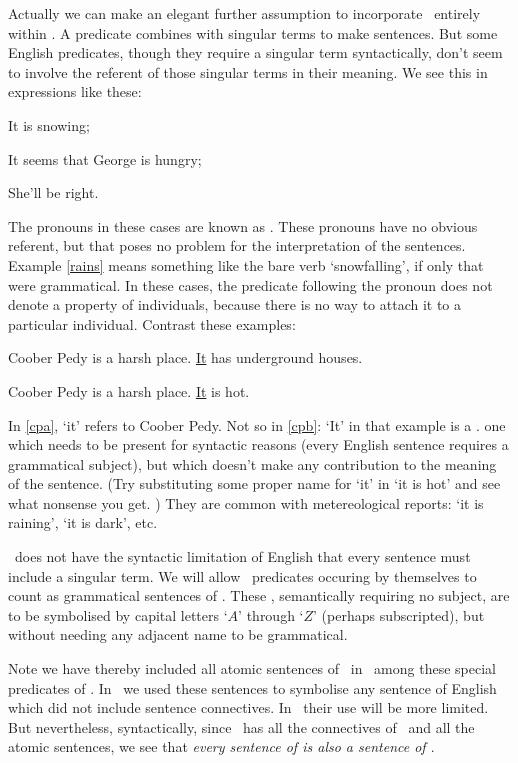 Actually we can make an elegant further assumption to incorporate \TFL\ entirely within \FOL. A predicate combines with singular terms to make sentences. But some English predicates, though they require a singular term syntactically, don't seem to involve the referent of those singular terms in their meaning. We see this in expressions like these: \begin{earg}
	\item[\ex{rains}] It is snowing;
	\item[\ex{seemss}] It seems that George is hungry;
	\item[\ex{shell}] She'll be right.
\end{earg} The pronouns in these cases are known as . These pronouns have no obvious referent, but that poses no problem for the interpretation of the sentences. Example \ref{rains} means something like the bare verb `snowfalling', if only that were grammatical. In these cases, the predicate following the pronoun does not denote a property of individuals, because there is no way to attach it to a particular individual.  Contrast these examples:  \begin{earg}
    \item[\ex{cpa}] Coober Pedy is a harsh place. \underline{It} has underground houses.
    	\item[\ex{cpb}] Coober Pedy is a harsh place. \underline{It} is hot.
    \end{earg}
In \ref{cpa}, `it' refers to Coober Pedy. Not so in \ref{cpb}: `It' in that example is a . one which needs to be present for syntactic reasons (every English sentence requires a grammatical subject), but which doesn't make any contribution to the meaning of the sentence. (Try substituting some proper name for `it' in `it is hot' and see what nonsense you get. ) They are common with metereological reports: `it is raining', `it is dark', etc. 

\FOL\ does not have the syntactic limitation of English that every sentence must include a singular term. We will allow \FOL\ predicates occuring by themselves to count as grammatical sentences of \FOL. These , semantically requiring no subject, are to be symbolised by capital letters `$A$' through `$Z$' (perhaps subscripted), but without needing any adjacent name to be grammatical.

Note we have thereby included all atomic sentences of \TFL\ in \FOL\ among these special predicates of \FOL. In \TFL\ we used these sentences to symbolise any sentence of English which did not include sentence connectives. In \FOL\ their use will be more limited. But nevertheless, syntactically, since \FOL\ has all the connectives of \TFL\ and all the atomic sentences, we see that \emph{every sentence of \textnormal{\TFL} is also a sentence of \textnormal{\FOL}}.

